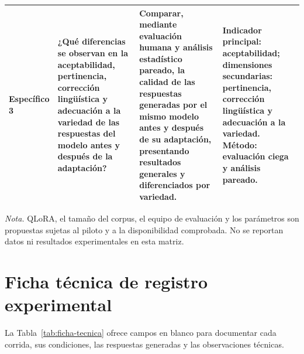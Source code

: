 \begin{table}[H]
\begin{threeparttable}
\begin{tabularx}{\textwidth}{@{}P{2.15cm}P{3.45cm}P{3.45cm}L@{}}
\addlinespace
Específico 3 & ¿Qué diferencias se observan en la aceptabilidad, pertinencia, corrección lingüística y adecuación a la variedad de las respuestas del modelo antes y después de la adaptación? & Comparar, mediante evaluación humana y análisis estadístico pareado, la calidad de las respuestas generadas por el mismo modelo antes y después de su adaptación, presentando resultados generales y diferenciados por variedad. & Indicador principal: aceptabilidad; dimensiones secundarias: pertinencia, corrección lingüística y adecuación a la variedad. Método: evaluación ciega y análisis pareado. \\
\bottomrule
\end{tabularx}
\begin{tablenotes}
\item \textit{Nota.} QLoRA, el tamaño del corpus, el equipo de evaluación y los parámetros son propuestas sujetas al piloto y a la disponibilidad comprobada. No se reportan datos ni resultados experimentales en esta matriz.
\end{tablenotes}
\end{threeparttable}
\end{table}

\clearpage
\chapter{Ficha técnica de registro experimental}
\label{anexo:ficha_tecnica}

La Tabla~\ref{tab:ficha-tecnica} ofrece campos en blanco para documentar cada corrida, sus condiciones, las respuestas generadas y las observaciones técnicas.

